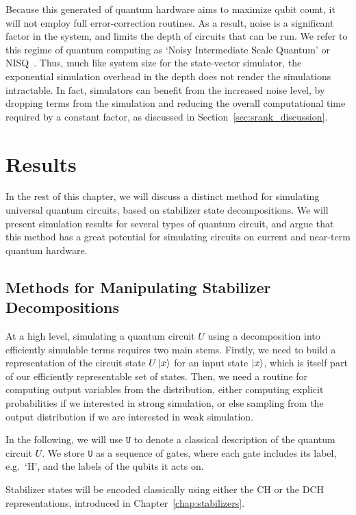 Because this generated of quantum hardware aims to  maximize qubit count, it will not employ full error-correction routines. As a result, noise is a significant factor in the system, and limits the depth of circuits that can be run. We refer to this regime of quantum computing as `Noisy Intermediate Scale Quantum' or NISQ~\cite{Preskill2018}. Thus, much like system size for the state-vector simulator, the exponential simulation overhead in the depth does not render the simulations intractable. In fact, simulators can benefit from the increased noise level, by dropping terms from the simulation and reducing the overall computational time required by a constant factor, as discussed in Section~\ref{sec:srank_discussion}.
\section{Results}
In the rest of this chapter, we will discuss a distinct method for simulating universal quantum circuits, based on stabilizer state decompositions. We will present simulation results for several types of quantum circuit, and argue that this method has a great potential for simulating circuits on current and near-term quantum hardware.\par
\subsection{Methods for Manipulating Stabilizer Decompositions}\label{sec:manipulating_decompositions}
At a high level, simulating a quantum circuit $U$ using a decomposition into efficiently simulable terms requires two main stems. Firstly, we need to build a representation of the circuit state $U\ket{x}$ for an input state $\ket{x}$, which is itself part of our efficiently representable set of states. Then, we need a routine for computing output variables from the distribution, either computing explicit probabilities if we interested in strong simulation, or else sampling from the output distribution if we are interested in weak simulation.\par
In the following, we will use $\mathtt{U}$ to denote a classical description of the quantum circuit $U$. We store $\mathtt{U}$ as a sequence of gates, where each gate includes its label, e.g.\ `H', and the labels of the qubits it acts on.\par
Stabilizer states will be encoded classically using either the CH or the DCH representations, introduced in Chapter~\ref{chap:stabilizers}.
